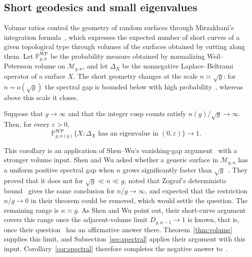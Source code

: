 \subsection{Short geodesics and small eigenvalues}\label{subsec:intro-geometry}
Volume ratios control the geometry of random surfaces through
Mirzakhani's integration formula~\cite{MirInv}, which expresses the expected number of
short curves of a given topological type through volumes of the surfaces
obtained by cutting along them. Let $\mathbb P^{\mathrm{WP}}_{g,n}$ be the
probability measure obtained by normalizing Weil--Petersson volume on
$\mathcal M_{g,n}$, and let $\Delta_X$ be the nonnegative Laplace--Beltrami
operator of a surface $X$. The short geometry changes at the scale
$n\asymp\sqrt g$: for $n=o(\sqrt g)$ the spectral gap is bounded below
with high probability~\cite[Theorem~3]{SW}, whereas above this scale it
closes.
\begin{mainresult}
\begin{corollary}\label{cor:spectral}
Suppose that $g\to\infty$ and that the integer cusp counts satisfy $n(g)/\sqrt g\to\infty$. Then, for every $\varepsilon>0$,
\[
 \mathbb P^{\mathrm{WP}}_{g,n(g)}
 \{X:\Delta_X\text{ has an eigenvalue in }(0,\varepsilon)\}\longrightarrow1.
\]
\end{corollary}
\end{mainresult}
This corollary is an application of Shen--Wu's vanishing-gap
argument~\cite[Theorem~1 and Proposition~35]{SW} with a stronger volume input.
Shen and Wu asked whether a generic surface in $\mathcal M_{g,n}$ has a
uniform positive spectral gap when $n$ grows significantly faster than
$\sqrt g$~\cite[Question~2]{SW}. They proved that it does not for
$\sqrt g\ll n\ll g$, noted that Zograf's deterministic
bound~\cite{ZogSpectral} gives the same conclusion for $n/g\to\infty$,
and expected that the restriction $n/g\to0$ in their theorem could be
removed, which would settle the question.
The remaining range is $n\asymp g$. As Shen and Wu point out, their
short-curve argument covers this range once the adjacent-volume limit
$D_{g,n-1}\to1$ is known, that is, once their question~\cite[Question~3]{SW} has an
affirmative answer there. Theorem~\ref{thm:volume} supplies this limit,
and Subsection~\ref{sec:spectral} applies their argument with this input.
Corollary~\ref{cor:spectral} therefore completes the negative answer
to~\cite[Question~2]{SW}.

